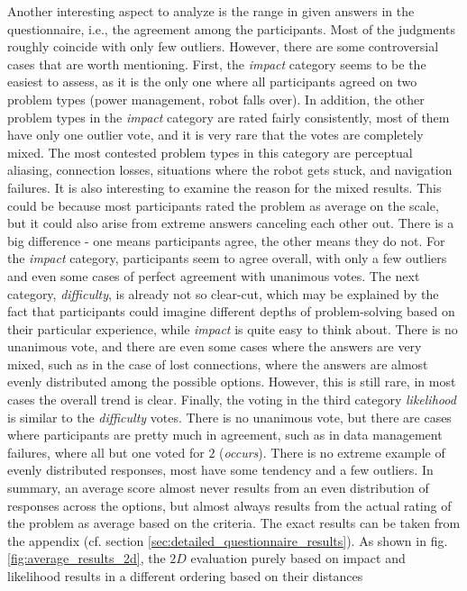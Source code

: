 \documentclass[english, master, utf8]{base/thesis_KBS}
\begin{document}
\noindent
Another interesting aspect to analyze is the range in given answers in the questionnaire, i.e., the agreement among the participants. Most of the judgments roughly coincide with
only few outliers. However, there are some controversial cases that are worth mentioning. First, the \textit{impact} category seems to be the easiest to assess, as it is the only
one where all participants agreed on two problem types (power management, robot falls over). In addition, the other problem types in the \textit{impact} category are rated fairly
consistently, most of them have only one outlier vote, and it is very rare that the votes are completely mixed. The most contested problem types in this category are perceptual
aliasing, connection losses, situations where the robot gets stuck, and navigation failures. It is also interesting to examine the reason for the mixed results. This could be
because most participants rated the problem as average on the scale, but it could also arise from extreme answers canceling each other out. There is a big difference - one means
participants agree, the other means they do not. For the \textit{impact} category, participants seem to agree overall, with only a few outliers and even some cases of perfect
agreement with unanimous votes. The next category, \textit{difficulty}, is already not so clear-cut, which may be explained by the fact that participants could imagine different
depths of problem-solving based on their particular experience, while \textit{impact} is quite easy to think about. There is no unanimous vote, and there are even some cases where
the answers are very mixed, such as in the case of lost connections, where the answers are almost evenly distributed among the possible options. However, this is still rare, in most
cases the overall trend is clear. Finally, the voting in the third category \textit{likelihood} is similar to the \textit{difficulty} votes. There is no unanimous vote, but there
are cases where participants are pretty much in agreement, such as in data management failures, where all but one voted for $2$ (\textit{occurs}). There is no extreme example of
evenly distributed responses, most have some tendency and a few outliers. In summary, an average score almost never results from an even distribution of responses across the options,
but almost always results from the actual rating of the problem as average based on the criteria. The exact results can be taken from the appendix 
(cf. section \ref{sec:detailed_questionnaire_results}). As shown in fig. \ref{fig:average_results_2d}, the $2D$ evaluation purely based on impact and likelihood results in a different ordering based on their distances 
\end{document}
